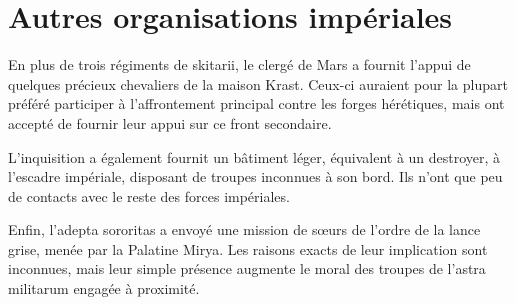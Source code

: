 \documentclass[10pt,a4paper]{book}
\begin{document}
\section{Autres organisations impériales}
En plus de trois régiments de skitarii, le clergé de Mars a fournit l'appui de quelques précieux chevaliers de la maison Krast. Ceux-ci auraient pour la plupart préféré participer à l'affrontement principal contre les forges hérétiques, mais ont accepté de fournir leur appui sur ce front secondaire.

L'inquisition a également fournit un bâtiment léger, équivalent à un destroyer, à l'escadre impériale, disposant de troupes inconnues à son bord. Ils n'ont que peu de contacts avec le reste des forces impériales.

Enfin, l'adepta sororitas a envoyé une mission de sœurs de l'ordre de la lance grise, menée par la Palatine Mirya. Les raisons exacts de leur implication sont inconnues, mais leur simple présence augmente le moral des troupes de l'astra militarum engagée à proximité.
\end{document}
